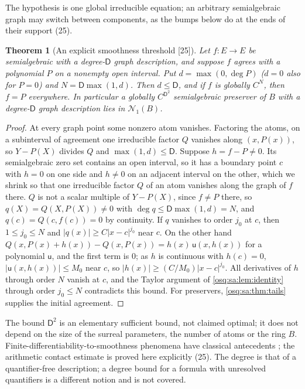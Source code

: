 \documentclass[11pt,letterpaper]{article}
\numberwithin{equation}{section}
\newtheorem{theorem}{Theorem}[section]
\theoremstyle{definition}
\theoremstyle{remark}
\theoremstyle{plain}
\newcommand{\Num}{\mathscr N}
\newcommand{\src}[1]{\textup{\textsf{[#1]}}}
\begin{document}
The hypothesis is one global irreducible equation; an arbitrary semialgebraic graph may switch between components, as the bumps below do at the ends of
their support (25).

\begin{theorem}[An explicit smoothness threshold \src{25}]\label{osq:sa:thm:degree}
Let $f:E\to E$ be semialgebraic with a degree-$\mathsf D$ graph description, and suppose $f$ agrees with a polynomial $P$ on a nonempty open interval. Put
$d=\max(0,\deg P)$ ($d=0$ also for $P=0$) and $N=\mathsf D\max(1,d)$. Then $d\le\mathsf D$, and if $f$ is globally $C^N$, then $f=P$ everywhere. In
particular a globally $C^{\mathsf D^2}$ semialgebraic preserver of $B$ with a degree-$\mathsf D$ graph description lies in $\Num_1(B)$.
\end{theorem}
\begin{proof}
At every graph point some nonzero atom vanishes. Factoring the atoms, on a subinterval of agreement one irreducible factor $Q$ vanishes along $(x,P(x))$,
so $Y-P(X)$ divides $Q$ and $\max(1,d)\le\mathsf D$. Suppose $h=f-P\ne0$. Its semialgebraic zero set contains an open interval, so it has a boundary point
$c$ with $h=0$ on one side and $h\ne0$ on an adjacent interval on the other, which we shrink so that one irreducible factor $Q$ of an atom vanishes along the
graph of $f$ there. $Q$ is not a scalar multiple of $Y-P(X)$, since $f\ne P$ there, so $q(X)=Q(X,P(X))\ne0$ with $\deg q\le\mathsf D\max(1,d)=N$, and
$q(c)=Q(c,f(c))=0$ by continuity. If $q$ vanishes to order $j_0$ at $c$, then $1\le j_0\le N$ and $|q(x)|\ge C|x-c|^{j_0}$ near $c$. On the other hand
$Q(x,P(x)+h(x))-Q(x,P(x))=h(x)\,\mathsf u(x,h(x))$ for a polynomial $\mathsf u$, and the first term is $0$; as $h$ is continuous with $h(c)=0$,
$|\mathsf u(x,h(x))|\le M_0$ near $c$, so $|h(x)|\ge(C/M_0)|x-c|^{j_0}$. All derivatives of $h$ through order $N$ vanish at $c$, and the Taylor argument
of \cref{osq:sa:lem:identity} through order $j_0\le N$ contradicts this bound. For preservers, \cref{osq:sa:thm:tails} supplies the initial agreement.
\end{proof}

The bound $\mathsf D^2$ is an elementary sufficient bound, not claimed optimal; it does not depend on the size of the surreal parameters, the number of
atoms or the ring $B$. Finite-differentiability-to-smoothness phenomena have classical antecedents \cite{Miller}; the arithmetic contact estimate is proved
here explicitly (25). The degree is that of a quantifier-free description; a degree bound for a formula with unresolved quantifiers is a different notion
and is not covered.
\end{document}
